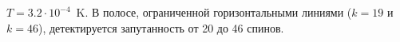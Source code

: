 $T=3.2\cdot10^{-4}$~K.
В полосе, ограниченной горизонтальными линиями ($k=19$ и $k=46$),
детектируется запутанность от 20 до 46 спинов.